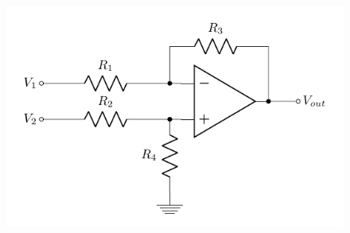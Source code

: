 	\begin{figure}[H] %
		\centering
		\includegraphics{diffamp}
		\caption{\rajah}
		\label{fig:diffamp}
	\end{figure}
	
\listclose %